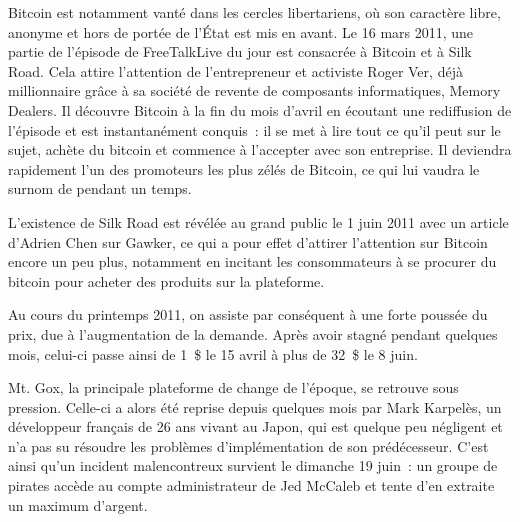 Bitcoin est notamment vanté dans les cercles libertariens, où son caractère libre, anonyme et hors de portée de l'État est mis en avant. Le 16 mars 2011, une partie de l'épisode de FreeTalkLive du jour est consacrée à Bitcoin et à Silk Road. Cela attire l'attention de l'entrepreneur et activiste Roger Ver, déjà millionnaire grâce à sa société de revente de composants informatiques, Memory Dealers. Il découvre Bitcoin à la fin du mois d'avril en écoutant une rediffusion de l'épisode et est instantanément conquis~: il se met à lire tout ce qu'il peut sur le sujet, achète du bitcoin et commence à l'accepter avec son entreprise. Il deviendra rapidement l'un des promoteurs les plus zélés de Bitcoin, ce qui lui vaudra le surnom de  pendant un temps.

L'existence de Silk Road est révélée au grand public le 1\ier{} juin 2011 avec un article d'Adrien Chen sur Gawker, ce qui a pour effet d'attirer l'attention sur Bitcoin encore un peu plus, notamment en incitant les consommateurs à se procurer du bitcoin pour acheter des produits sur la plateforme. %


Au cours du printemps 2011, on assiste par conséquent à une forte poussée du prix, due à l'augmentation de la demande. Après avoir stagné pendant quelques mois, celui-ci passe ainsi de 1~\$ le 15 avril à plus de 32~\$ le 8 juin.


Mt. Gox, la principale plateforme de change de l'époque, se retrouve sous pression. Celle-ci a alors été reprise depuis quelques mois par Mark Karpelès, un développeur français de 26 ans vivant au Japon, qui est quelque peu négligent et n'a pas su résoudre les problèmes d'implémentation de son prédécesseur. C'est ainsi qu'un incident malencontreux survient le dimanche 19 juin~: un groupe de pirates accède au compte administrateur de Jed McCaleb et tente d'en extraite un maximum d'argent.

